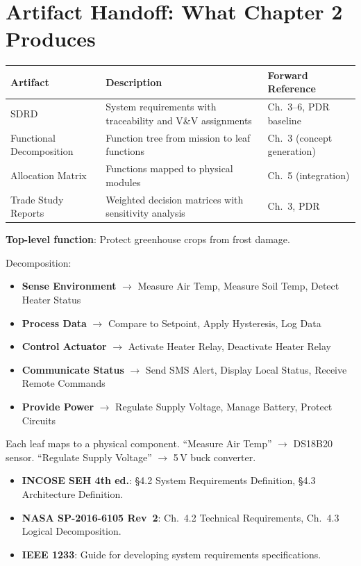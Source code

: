 \section{Artifact Handoff: What Chapter 2 Produces}
\begin{table}[htbp]\centering\small
\begin{tabularx}{\textwidth}{l X l}
\toprule
\textbf{Artifact} & \textbf{Description} & \textbf{Forward Reference} \\
\midrule
SDRD & System requirements with traceability and V\&V assignments & Ch.~3--6, PDR baseline \\
Functional Decomposition & Function tree from mission to leaf functions & Ch.~3 (concept generation) \\
Allocation Matrix & Functions mapped to physical modules & Ch.~5 (integration) \\
Trade Study Reports & Weighted decision matrices with sensitivity analysis & Ch.~3, PDR \\
\bottomrule
\end{tabularx}
\end{table}


\begin{greenshieldbox}
\textbf{Top-level function}: Protect greenhouse crops from frost damage.

Decomposition:
\begin{itemize}[nosep,leftmargin=1.5em]
\item \textbf{Sense Environment} $\to$ Measure Air Temp, Measure Soil Temp, Detect Heater Status
\item \textbf{Process Data} $\to$ Compare to Setpoint, Apply Hysteresis, Log Data
\item \textbf{Control Actuator} $\to$ Activate Heater Relay, Deactivate Heater Relay
\item \textbf{Communicate Status} $\to$ Send SMS Alert, Display Local Status, Receive Remote Commands
\item \textbf{Provide Power} $\to$ Regulate Supply Voltage, Manage Battery, Protect Circuits
\end{itemize}
Each leaf maps to a physical component. ``Measure Air Temp'' $\to$ DS18B20 sensor. ``Regulate Supply Voltage'' $\to$ 5\,V buck converter.
\end{greenshieldbox}

\begin{keyconceptbox}
\begin{itemize}[nosep,leftmargin=1.5em]
\item \textbf{INCOSE SEH 4th ed.}: \S4.2 System Requirements Definition, \S4.3 Architecture Definition.
\item \textbf{NASA SP-2016-6105 Rev~2}: Ch.~4.2 Technical Requirements, Ch.~4.3 Logical Decomposition.
\item \textbf{IEEE 1233}: Guide for developing system requirements specifications.
\end{itemize}
\end{keyconceptbox}

